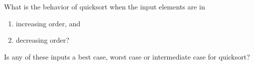 What is the behavior of quicksort when the input elements are in

\begin{enumerate}

\item  increasing order, and

\item  decreasing order?

\end{enumerate}

Is any of these inputs a best case, worst case or intermediate case for
quicksort?
